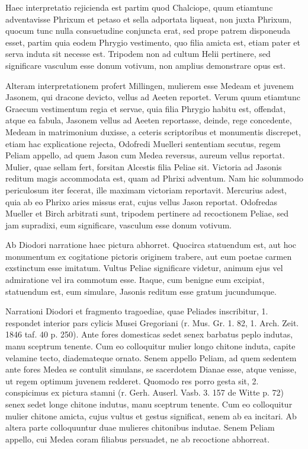 \documentclass[landscape, a4paper, 11pt, oneside, polutonikogreek, german]{article}
\begin{document}
Haec interpretatio rejicienda est partim quod Chalciope, quum etiamtunc adventavisse Phrixum et petaso et sella adportata liqueat, non juxta Phrixum, quocum tunc nulla consuetudine conjuncta erat, sed prope patrem disponeuda esset, partim quia eodem Phrygio vestimento, quo filia amicta est, etiam pater et serva induta sit necesse est. Tripodem non ad cultum Helii pertinere, sed significare vasculum esse donum votivum, non amplius demonstrare opus est.

Alteram interpretationem profert Millingen, mulierem esse Medeam et juvenem Jasonem, qui dracone devicto, vellus ad Aeeten reportet. Verum quum etiamtunc Graecum vestimentum regia et servae, quia filia Phrygio habitu est, offendat, atque ea fabula, Jasonem vellus ad Aeeten reportasse, deinde, rege concedente, Medeam in matrimonium duxisse, a ceteris scriptoribus et monumentis discrepet, etiam hac explicatione rejecta, Odofredi Muelleri sententiam secutus, regem Peliam appello, ad quem Jason cum Medea reversus, aureum vellus reportat. Mulier, quae sellam fert, forsitan Alcestis filia Peliae sit. Victoria ad Jasonis reditum magis accommodata est, quam ad Phrixi adventum. Nam hic solummodo periculosum iter fecerat, ille maximam victoriam reportavit. Mercurius adest, quia ab eo Phrixo aries missus erat, cujus vellus Jason reportat. Odofredas Mueller et Birch arbitrati sunt, tripodem pertinere ad recoctionem Peliae, sed jam supradixi, eum significare, vasculum esse donum votivum.

Ab Diodori narratione haec pictura abhorret. Quocirca statuendum est, aut hoc monumentum ex cogitatione pictoris originem trabere, aut eum poetae carmen exstinctum esse imitatum. Vultus Peliae significare videtur, animum ejus vel admiratione vel ira commotum esse. Itaque, cum benigne eum excipiat, statuendum est, eum simulare, Jasonis reditum esse gratum jucundumque.

Narrationi Diodori et fragmento tragoediae, quae Peliades inscribitur, 1. respondet interior pars cylicis Musei Gregoriani (r. Mus. Gr. 1. 82, 1. Arch. Zeit. 1846 taf. 40 p. 250). Ante fores domesticas sedet senex barbatus peplo indutas, manu sceptrum tenente. Cum eo colloquitur mulier longo chitone induta, capite velamine tecto, diademateque ornato. Senem appello Peliam, ad quem sedentem ante fores Medea se contulit simulans, se sacerdotem Dianae esse, atque venisse, ut regem optimum juvenem redderet. Quomodo res porro gesta sit, 2. conspicimus ex pictura stamni (r. Gerh. Auserl. Vasb. 3. 157 de Witte p. 72) senex sedet longe chitone indutus, manu sceptrum tenente. Cum eo colloquitur mulier chitone amicta, cujus vultus et gestus significat, senem ab ea incitari. Ab altera parte colloquuntur duae mulieres chitonibus indutae. Senem Peliam appello, cui Medea coram filiabus persuadet, ne ab recoctione abhorreat.
\end{document}
